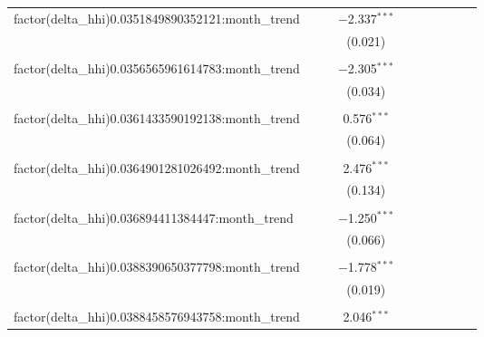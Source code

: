 \begin{table}[H]
{\begin{tabular}{@{\extracolsep{5pt}}lccccccccc}
  factor(delta\_hhi)0.0351849890352121:month\_trend &  &  & $-$2.337$^{***}$ &  &  &  &  &  &  \\  

   &  &  & (0.021) &  &  &  &  &  &  \\  

   & & & & & & & & & \\  

  factor(delta\_hhi)0.0356565961614783:month\_trend &  &  & $-$2.305$^{***}$ &  &  &  &  &  &  \\  

   &  &  & (0.034) &  &  &  &  &  &  \\  

   & & & & & & & & & \\  

  factor(delta\_hhi)0.0361433590192138:month\_trend &  &  & 0.576$^{***}$ &  &  &  &  &  &  \\  

   &  &  & (0.064) &  &  &  &  &  &  \\  

   & & & & & & & & & \\  

  factor(delta\_hhi)0.0364901281026492:month\_trend &  &  & 2.476$^{***}$ &  &  &  &  &  &  \\  

   &  &  & (0.134) &  &  &  &  &  &  \\  

   & & & & & & & & & \\  

  factor(delta\_hhi)0.036894411384447:month\_trend &  &  & $-$1.250$^{***}$ &  &  &  &  &  &  \\  

   &  &  & (0.066) &  &  &  &  &  &  \\  

   & & & & & & & & & \\  

  factor(delta\_hhi)0.0388390650377798:month\_trend &  &  & $-$1.778$^{***}$ &  &  &  &  &  &  \\  

   &  &  & (0.019) &  &  &  &  &  &  \\  

   & & & & & & & & & \\  

  factor(delta\_hhi)0.0388458576943758:month\_trend &  &  & 2.046$^{***}$ &  &  &  &  &  &  \\  


\end{tabular}}
\end{table}
